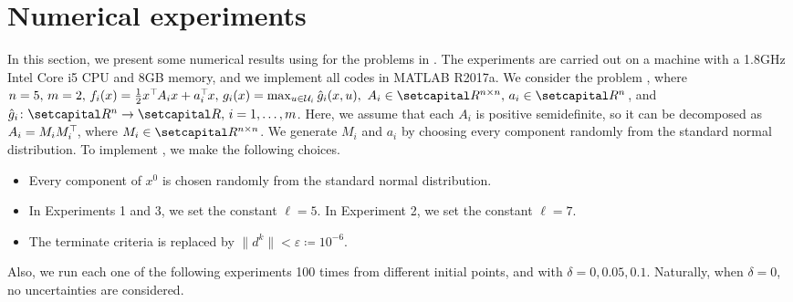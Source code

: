 \documentclass[../main]{subfiles}
\begin{document}
\section{Numerical experiments} 
In this section, we present some numerical results using  for the problems in . The experiments are carried out on a machine with a 1.8GHz Intel Core i5 CPU and 8GB memory, and we implement all codes in MATLAB R2017a. We consider the problem , where $n = 5,\, m = 2,\, f_i(x) = \frac{1}{2} x^\T A_i x + a_i^\T x,\, g_i(x) = \max_{u \in {\mathcal{U}}_i } \hat{g}_i (x,u),\ A_i \in \setR^{n \times n},\, a_i \in \setR^n$, and $\hat{g}_i\colon \setR^n \to \setR,\, i = 1,\ldots, m$. Here, we assume that each $A_i$ is positive semidefinite, so it can be decomposed as $A_i = M_i M_i^\top\hspace{-1pt}$, where $M_i \in \setR^{n \times n}$. We generate $M_i$ and $a_i$ by choosing every component randomly from the standard normal distribution. To implement , we make the following choices.
\begin{remark}
\begin{itemize}
\item Every component of $x^0$ is chosen randomly from the standard normal distribution.
\item In Experiments 1 and 3, we set the constant $\ell = 5$. In Experiment 2, we set the constant $\ell = 7$.
\item The terminate criteria is replaced by $\|d^k\| < \varepsilon \coloneqq 10^{-6}$.
\end{itemize}
\end{remark}

Also, we run each one of the following experiments 100 times from different initial points, and with $\delta = 0, 0.05, 0.1$. Naturally, when $\delta = 0$, no uncertainties are considered.
\end{document}

